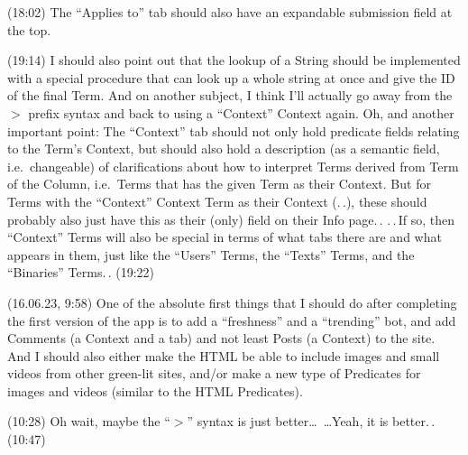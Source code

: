 \documentclass{report}
\begin{document}
(18:02) The ``Applies to'' tab should also have an expandable submission field at the top.

(19:14) I should also point out that the lookup of a String should be implemented with a special procedure that can look up a whole string at once and give the ID of the final Term. And on another subject, I think I'll actually go away from the $>$ prefix syntax and back to using a ``Context'' Context again. Oh, and another important point: The ``Context'' tab should not only hold predicate fields relating to the Term's Context, but should also hold a description (as a semantic field, i.e.\ changeable) of clarifications about how to interpret Terms derived from Term of the Column, i.e.\ Terms that has the given Term as their Context. But for Terms with the ``Context'' Context Term as their Context (.\,.), these should probably also just have this as their (only) field on their Info page.\,. .\,.\,If so, then ``Context'' Terms will also be special in terms of what tabs there are and what appears in them, just like the ``Users'' Terms, the ``Texts'' Terms, and the ``Binaries'' Terms.\,. (19:22)


(16.06.23, 9:58) One of the absolute first things that I should do after completing the first version of the app is to add a ``freshness'' and a ``trending'' bot, and add Comments (a Context and a tab) and not least Posts (a Context) to the site. And I should also either make the HTML be able to include images and small videos from other green-lit sites, and/or make a new type of Predicates for images and videos (similar to the HTML Predicates).


(10:28) Oh wait, maybe the ``$>$'' syntax is just better\ldots\ \ldots Yeah, it is better.\,. (10:47)
\end{document}
